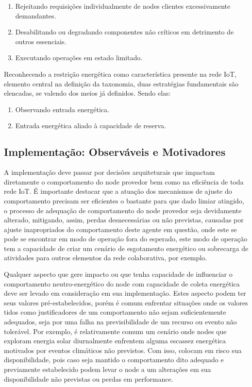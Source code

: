 \begin{enumerate}[label=(\subscript{M}{{\arabic*}})]
	\item Rejeitando requisições individualmente de nodes clientes excessivamente demandantes.
	\item Desabilitando ou degradando componentes não críticos em detrimento de outros essenciais. 
	\item Executando operações em estado limitado.	
\end{enumerate}

Reconhecendo a restrição energética como característica presente na rede \acs{IoT}, elemento central na definição da taxonomia, duas estratégias fundamentais são elencadas, se valendo dos meios já definidos. Sendo elas:

\begin{enumerate}
	\item Observando entrada energética.
	\item Entrada energética aliado à capacidade de reserva.
\end{enumerate}




\subsection{Implementação: Observáveis e Motivadores}

A implementação deve passar por decisões arquiteturais que impactam diretamente o comportamento do node provedor bem como na eficiência de toda rede \acs{IoT}. É importante destacar que a atuação dos mecanismos de ajuste do comportamento precisam ser eficientes o bastante para que dado limiar atingido, o processo de adequação de comportamento do node provedor seja devidamente alterado, mitigando, assim, perdas desnecessárias ou não previstas, causadas por ajuste inapropriados do comportamento deste agente em questão, onde este se pode se encontrar em modo de operação fora do esperado, este modo de operação tem a capacidade de criar um cenário de esgotamento energético ou sobrecarga de atividades para outros elementos da rede colaborativa, por exemplo.

Qualquer aspecto que gere impacto ou que tenha capacidade de influenciar o comportamento neutro-energético do node com capacidade de coleta energética deve ser levado em consideração em sua implementação. Estes aspecto podem ter seus valores pré-estabelecidos, porém é comum enfrentar situações onde os valores tidos como justificadores de um comportamento não sejam suficientemente adequados, seja por uma falha na previsibilidade de um recurso ou evento não tolerável. Por exemplo, é relativamente comum um cenário onde nodes que exploram energia solar diurnalmente enfrentem alguma escassez energética motivados por eventos climáticos não previstos. Com isso, colocam em risco sua disponibilidade, pois caso seja mantido o comportamento dito adequado e previamente estabelecido podem levar o node a um alterações em sua disponibilidade não previstas ou perdas em performance. 

